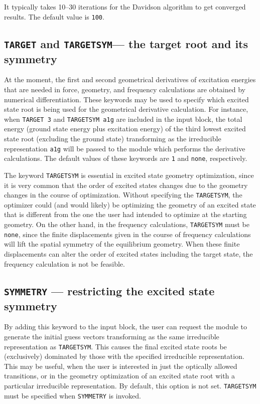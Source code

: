 It typically takes 10--30 iterations for the Davidson algorithm to get converged results.
The default value is \verb+100+.

\subsection{{\tt TARGET} and {\tt TARGETSYM}--- the target root and its symmetry}

At the moment, the first and second geometrical derivatives of excitation 
energies that are needed in force, geometry, and frequency calculations are
obtained by numerical differentiation.  These keywords may be used to specify
which excited state root is being used for the geometrical derivative calculation.
For instance, when \verb+TARGET 3+ and \verb+TARGETSYM a1g+ are included in the
input block, the total energy (ground state energy plus excitation energy) 
of the third lowest excited state root (excluding the ground state) transforming as
the irreducible representation \verb+a1g+ will be passed to the module which performs
the derivative calculations.  The default values of these keywords are \verb+1+ and \verb+none+,
respectively.

The keyword \verb+TARGETSYM+ is essential in excited state geometry 
optimization, since it is very common that the order of excited states changes due to 
the geometry changes in the course of optimization.  Without specifying the \verb+TARGETSYM+,
the optimizer could (and would likely) be optimizing the geometry of an excited state that
is different from the one the user had intended to optimize at the starting geometry.
On the other hand, in the frequency calculations, \verb+TARGETSYM+ must be \verb+none+,
since the finite displacements given in the course of frequency calculations will lift
the spatial symmetry of the equilibrium geometry.  When these finite displacements can
alter the order of excited states including the target state, the frequency calculation
is not be feasible.

\subsection{{\tt SYMMETRY} --- restricting the excited state symmetry}

By adding this keyword to the input block, the user can request the module to
generate the initial guess vectors transforming as the 
same irreducible representation as \verb+TARGETSYM+.  This causes the final
excited state roots be (exclusively) dominated by those with the specified 
irreducible representation.  This may be useful, when the user is interested in
just the optically allowed transitions, or in the geometry optimization of
an excited state root with a particular irreducible representation.  By default,
this option is not set.  \verb+TARGETSYM+ must be specified when \verb+SYMMETRY+ 
is invoked.

